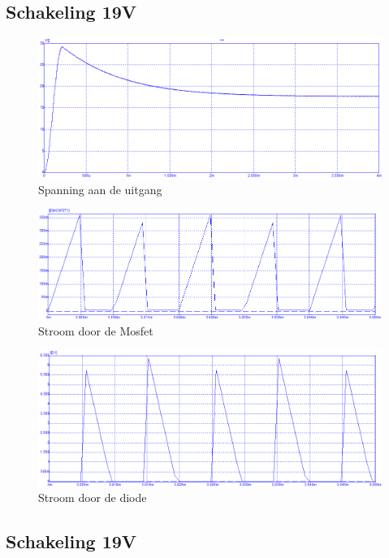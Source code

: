 \documentclass[11pt,a4paper]{article}
\begin{document}
\subsection{Schakeling 19V}

\begin{figure}[h!]
  \centering
  \includegraphics[width = 13.5cm]{Vout 15V.png}
  \caption{Spanning aan de uitgang}
\end{figure}

\begin{figure}[h!]
  \centering
  \includegraphics[width = 13.5cm]{Ids 15V.png}
  \caption{Stroom door de Mosfet}
\end{figure}

\begin{figure}[h!]
  \centering
  \includegraphics[width = 13.5cm]{Id 15V.png}
  \caption{Stroom door de diode}
\end{figure}


\subsection{Schakeling 19V}
\end{document}
